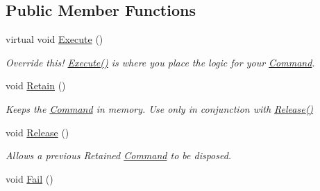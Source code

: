 \subsection*{Public Member Functions}
\begin{DoxyCompactItemize}
\item 
\hypertarget{classstrange_1_1extensions_1_1command_1_1impl_1_1_command_a4a1155270428842c342482c6885b2652}{virtual void \hyperlink{classstrange_1_1extensions_1_1command_1_1impl_1_1_command_a4a1155270428842c342482c6885b2652}{Execute} ()}\label{classstrange_1_1extensions_1_1command_1_1impl_1_1_command_a4a1155270428842c342482c6885b2652}

\begin{DoxyCompactList}\small\item\em Override this! {\ttfamily \hyperlink{classstrange_1_1extensions_1_1command_1_1impl_1_1_command_a4a1155270428842c342482c6885b2652}{Execute()}} is where you place the logic for your \hyperlink{classstrange_1_1extensions_1_1command_1_1impl_1_1_command}{Command}. \end{DoxyCompactList}\item 
\hypertarget{classstrange_1_1extensions_1_1command_1_1impl_1_1_command_a1525def9650d4b6ed6ed6cef2936d892}{void \hyperlink{classstrange_1_1extensions_1_1command_1_1impl_1_1_command_a1525def9650d4b6ed6ed6cef2936d892}{Retain} ()}\label{classstrange_1_1extensions_1_1command_1_1impl_1_1_command_a1525def9650d4b6ed6ed6cef2936d892}

\begin{DoxyCompactList}\small\item\em Keeps the \hyperlink{classstrange_1_1extensions_1_1command_1_1impl_1_1_command}{Command} in memory. Use only in conjunction with {\ttfamily \hyperlink{classstrange_1_1extensions_1_1command_1_1impl_1_1_command_a783b532e62f1c5c7789ae1a5791c75c7}{Release()}} \end{DoxyCompactList}\item 
\hypertarget{classstrange_1_1extensions_1_1command_1_1impl_1_1_command_a783b532e62f1c5c7789ae1a5791c75c7}{void \hyperlink{classstrange_1_1extensions_1_1command_1_1impl_1_1_command_a783b532e62f1c5c7789ae1a5791c75c7}{Release} ()}\label{classstrange_1_1extensions_1_1command_1_1impl_1_1_command_a783b532e62f1c5c7789ae1a5791c75c7}

\begin{DoxyCompactList}\small\item\em Allows a previous Retained \hyperlink{classstrange_1_1extensions_1_1command_1_1impl_1_1_command}{Command} to be disposed. \end{DoxyCompactList}\item 
\hypertarget{classstrange_1_1extensions_1_1command_1_1impl_1_1_command_aa91c0b75c21945fdf87105d806d3ba79}{void \hyperlink{classstrange_1_1extensions_1_1command_1_1impl_1_1_command_aa91c0b75c21945fdf87105d806d3ba79}{Fail} ()}\label{classstrange_1_1extensions_1_1command_1_1impl_1_1_command_aa91c0b75c21945fdf87105d806d3ba79}


\end{DoxyCompactItemize}
